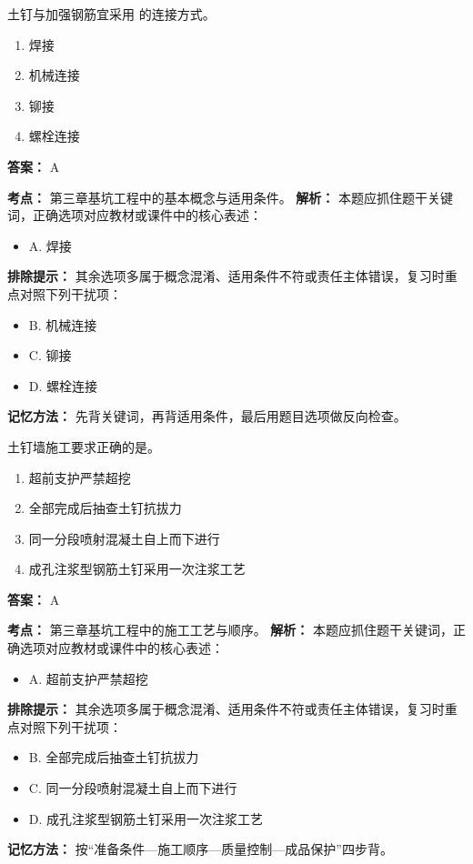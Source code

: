 \documentclass[UTF8,fontset=fandol,11pt]{ctexart}
\begin{document}
\begin{quizbox}[title={第 9 题}]
土钉与加强钢筋宜采用 的连接方式。\\
\begin{enumerate}[label=\Alph*.]
\item 焊接
\item 机械连接
\item 铆接
\item 螺栓连接
\end{enumerate}
\textbf{答案：} A
\vspace{0.25em}
\begin{answerbox}[title={考点解析}]
\textbf{考点：} 第三章基坑工程中的基本概念与适用条件。
\textbf{解析：} 本题应抓住题干关键词，正确选项对应教材或课件中的核心表述：
\begin{itemize}
\item A. 焊接
\end{itemize}
\textbf{排除提示：} 其余选项多属于概念混淆、适用条件不符或责任主体错误，复习时重点对照下列干扰项：
\begin{itemize}
\item B. 机械连接
\item C. 铆接
\item D. 螺栓连接
\end{itemize}
\textbf{记忆方法：} 先背关键词，再背适用条件，最后用题目选项做反向检查。
\end{answerbox}
\end{quizbox}

\begin{quizbox}[title={第 10 题}]
土钉墙施工要求正确的是。\\
\begin{enumerate}[label=\Alph*.]
\item 超前支护严禁超挖
\item 全部完成后抽查土钉抗拔力
\item 同一分段喷射混凝土自上而下进行
\item 成孔注浆型钢筋土钉采用一次注浆工艺
\end{enumerate}
\textbf{答案：} A
\vspace{0.25em}
\begin{answerbox}[title={考点解析}]
\textbf{考点：} 第三章基坑工程中的施工工艺与顺序。
\textbf{解析：} 本题应抓住题干关键词，正确选项对应教材或课件中的核心表述：
\begin{itemize}
\item A. 超前支护严禁超挖
\end{itemize}
\textbf{排除提示：} 其余选项多属于概念混淆、适用条件不符或责任主体错误，复习时重点对照下列干扰项：
\begin{itemize}
\item B. 全部完成后抽查土钉抗拔力
\item C. 同一分段喷射混凝土自上而下进行
\item D. 成孔注浆型钢筋土钉采用一次注浆工艺
\end{itemize}
\textbf{记忆方法：} 按“准备条件—施工顺序—质量控制—成品保护”四步背。
\end{answerbox}
\end{quizbox}
\end{document}
